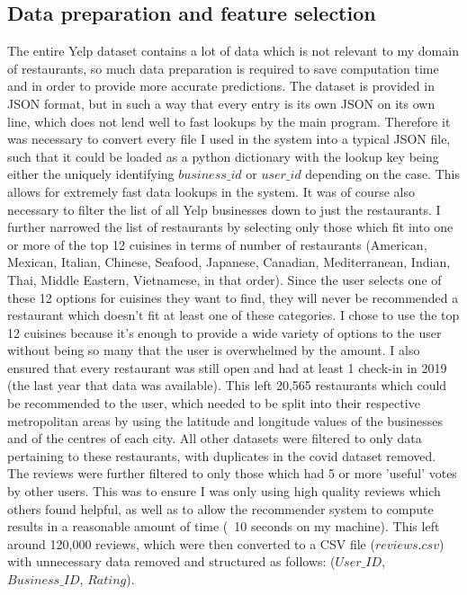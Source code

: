 \documentclass[conference]{IEEEtran}
\begin{document}
\subsection{Data preparation and feature selection}
The entire Yelp dataset contains a lot of data which is not relevant to my domain of restaurants, so much data 
preparation is required to save computation time and in order to provide more accurate predictions. 
The dataset is provided in JSON format, but in such a way that every entry is its own JSON on its own line, 
which does not lend well to fast lookups by the main program. 
Therefore it was necessary to convert every file I used in the system into a typical JSON file, such that it could 
be loaded as a python dictionary with the lookup key being either the uniquely identifying $business\_id$ or 
$user\_id$ depending on the case. 
This allows for extremely fast data lookups in the system. 
It was of course also necessary to filter the list of all Yelp businesses down to just the restaurants. 
I further narrowed the list of restaurants by selecting only those which fit into one or more of the top 12 
cuisines in terms of number of restaurants (American, Mexican, Italian, Chinese, Seafood, Japanese, Canadian, 
Mediterranean, Indian, Thai, Middle Eastern, Vietnamese, in that order). 
Since the user selects one of these 12 options for cuisines they want to find, they will 
never be recommended a restaurant which doesn't fit at least one of these categories. 
I chose to use the top 12 cuisines because it's enough to provide a wide variety of options to the user without 
being so many that the user is overwhelmed by the amount. 
I also ensured that every restaurant was still open and had at least 1 check-in in 2019 (the last year that 
data was available). 
This left 20,565 restaurants which could be recommended to the user, which needed to be split into their respective 
metropolitan areas by using the latitude and longitude values of the businesses and of the centres of each city. 
All other datasets were filtered to only data pertaining to these restaurants, with duplicates in the 
covid dataset removed. 
The reviews were further filtered to only those which had 5 or more 'useful' votes by other users. 
This was to ensure I was only using high quality reviews which others found helpful, as well as to allow the 
recommender system to compute results in a reasonable amount of time (~10 seconds on my machine). 
This left around 120,000 reviews, which were then converted to a CSV file ($reviews.csv$) with unnecessary data 
removed and structured as follows: ($User\_ID$, $Business\_ID$, $Rating$). 
\end{document}
